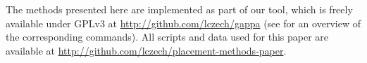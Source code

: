 
The methods presented here are implemented as part of our  tool,
which is freely available under GPLv3 at \url{http://github.com/lczech/gappa}
(see  for an overview of the corresponding commands).
All scripts and data used for this paper are available at \url{http://github.com/lczech/placement-methods-paper}.


%

%

